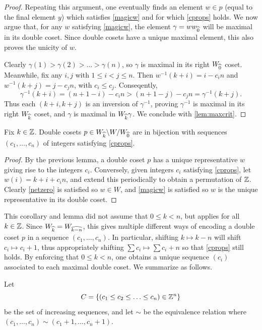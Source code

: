 \begin{proof}
Repeating this argument, one eventually finds an element $w \in p$ (equal to the final element $y$) which satisfies \eqref{magicw} and for which \eqref{cprops} holds. We now argue that, for any $w$ satisfying \eqref{magicw}, the element $\gamma = w w_{\widehat{0}}$ will be maximal in its double coset. Since double cosets have a unique maximal element, this also proves the unicity of $w$.

Clearly $\gamma(1) > \gamma(2) > \ldots > \gamma(n)$, so $\gamma$ is maximal in its right $W_{\widehat{0}}$ coset. Meanwhile, fix any $i, j$ with $1 \le i < j \le n$. Then $w^{-1}(k+i) = i - c_i n$ and $w^{-1}(k+j) = j - c_j n$, with $c_i \le c_j$. Conseqently, 
\[ \gamma^{-1}(k+i) = (n+1-i) - c_i n > (n+1-j) - c_j n = \gamma^{-1}(k+j). \]
Thus each $(k+i,k+j)$ is an inversion of $\gamma^{-1}$, proving $\gamma^{-1}$ is maximal in its right $W_{\widehat{k}}$ coset, and $\gamma$ is maximal in $W_{\widehat{k}} \gamma$. We conclude with \cref{lem:maxcrit}.
\end{proof}

\begin{corollary} \label{cor:bijection1} Fix $k \in \mathbb{Z}$. Double cosets $p \in W_{\widehat{k}} \backslash W / W_{\widehat{0}}$ are in bijection with sequences $(c_1, \ldots, c_n)$ of integers satisfying \eqref{cprops}. \end{corollary}

\begin{proof} By the previous lemma, a double coset $p$ has a unique representative $w$ giving rise to the integers $c_i$. Conversely, given integers $c_i$ satisfying \eqref{cprops}, let $w(i) = k+i + c_i n$, and extend this periodically to obtain a permutation of $\mathbb{Z}$. Clearly \eqref{netzero} is satisfied so $w \in W$, and \eqref{magicw} is satisfied so $w$ is the unique representative in its double coset. \end{proof}

This corollary and lemma did not assume that $0 \le k < n$, but applies for all $k \in \mathbb{Z}$. Since $W_{\widehat{k}} = W_{\widehat{k-n}}$, this gives multiple different ways of encoding a double coset $p$ in a sequence $(c_1, \ldots, c_n)$. In particular, shifting $k \mapsto k-n$ will shift $c_i \mapsto c_i + 1$, thus appropriately shifting $\sum c_i \mapsto \sum c_i + n$ so that \eqref{cprops} still holds. By enforcing that $0 \le k < n$, one obtains a unique sequence $(c_i)$ associated to each maximal double coset. We summarize as follows.

\begin{defn} Let 
\[ C = \{(c_1 \le c_2 \le \ldots \le c_n) \in \mathbb{Z}^n\}\] be the set of increasing sequences, and let $\sim$ be the equivalence relation where $(c_1, \ldots, c_n) \sim (c_1+1, \ldots, c_n+1)$. \end{defn}

